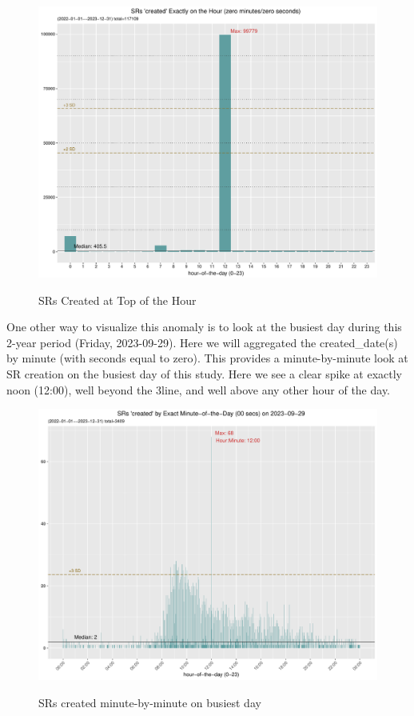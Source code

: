 \documentclass[12pt, titlepage]{article}
\begin{document}
{	\begin{figure}[tbp]
		 \centering
 		 \caption{SRs Created at Top of the Hour}
		 \includegraphics[width = \textwidth]{SR_created_by_top_of_hour.pdf}
		 \label{fig:tophourcreated}
	\end{figure}	

	One other way to visualize this anomaly is to look at the busiest day during this 2-year period (Friday, 2023-09-29).
	Here we will aggregated the created\_date(s) by minute (with seconds equal to zero). This provides a 
	minute-by-minute look at SR creation on the busiest day of this study. Here we see a clear spike at 
	exactly noon (12:00), well beyond the 3\textsigma line, and well above any other hour of the day.
	
	\begin{figure}[tbp]
		 \centering
		 \caption{SRs created minute-by-minute on busiest day}
		 \includegraphics[width=\textwidth]{SR_created_by_minute_of_busiest_day.pdf}
		 \label{fig:busiestcreated}
	\end{figure}	

}
\end{document}
